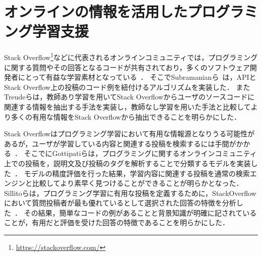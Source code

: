 


\section{オンラインの情報を活用したプログラミング学習支援}


%
%

Stack Overflow\footnote{\url{https://stackoverflow.com/}}などに代表されるオンラインコミュニティでは，プログラミングに関する質問やその回答となるコードが共有されており，多くのソフトウェア開発者にとって有益な学習素材となっている~\cite{Mamykina_Design_SO}．
そこでSubramanianら~\cite{Live_in_Documentation}は，APIとStack Overflow上の投稿のコード例を紐付けるアルゴリズムを実装した．
またTreudeら\cite{Augmenting_API_Documentation}は，教師あり学習を用いてStack Overflowからユーザのソースコードに関連する情報を抽出する手法を実装し，教師なし学習を用いた手法と比較してより多くの有用な情報をStack Overflowから抽出できることを明らかにした．

Stack Overflowはプログラミング学習において有用な情報源となりうる可能性があるが，ユーザが学習している内容と関連する投稿を検索するには手間がかかる~\cite{study_SO}．
そこでにGottipatiらは，プログラミングに関するオンラインコミュニティ上での投稿を，説明文及び投稿のタグを解析することで分類するモデルを実装した~\cite{Gottipati_finding_resource}．
モデルの精度評価を行った結果，学習内容に関連する投稿を通常の検索エンジンと比較してより素早く見つけることができることが明らかとなった．
Sillitoらは，プログラミング学習に有用な投稿を定義するために，StackOverflowにおいて質問投稿者が最も優れているとして選択された回答の特徴を分析した~\cite{StackOverflowCodeExample}．
その結果，簡単なコードの例があることと背景知識が明確に記されていることが，有用だと評価を受けた回答の特徴であることを明らかにした．


